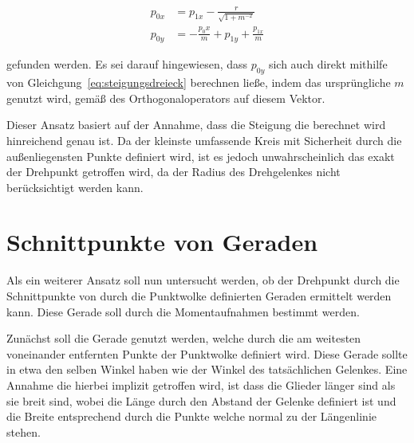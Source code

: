 \begin{equation}
    \begin{split}
        p_{0x} &= p_{1x} - \frac{r}{\sqrt{1 + m^{-2}}} \\
        p_{0y} &= - \frac{p_0x}{m} + p_{1y} + \frac{p_{1x}}{m}
    \end{split}
\end{equation}

gefunden werden.
Es sei darauf hingewiesen, dass $p_{0y}$ sich auch direkt mithilfe von Gleichgung~\ref{eq:steigungsdreieck} berechnen ließe, indem das ursprüngliche $m$ genutzt wird, gemäß des Orthogonaloperators auf diesem Vektor.

Dieser Ansatz basiert auf der Annahme, dass die Steigung die berechnet wird hinreichend genau ist.
Da der kleinste umfassende Kreis mit Sicherheit durch die außenliegensten Punkte definiert wird, ist es jedoch unwahrscheinlich das exakt der Drehpunkt getroffen wird, da der Radius des Drehgelenkes nicht berücksichtigt werden kann.



\section{Schnittpunkte von Geraden}\label{ch:schnittpunkt_gerade}

Als ein weiterer Ansatz soll nun untersucht werden, ob der Drehpunkt durch die Schnittpunkte von durch die Punktwolke definierten Geraden ermittelt werden kann.
Diese Gerade soll durch die Momentaufnahmen bestimmt werden.

Zunächst soll die Gerade genutzt werden, welche durch die am weitesten voneinander entfernten Punkte der Punktwolke definiert wird.
Diese Gerade sollte in etwa den selben Winkel haben wie der Winkel des tatsächlichen Gelenkes.
Eine Annahme die hierbei implizit getroffen wird, ist dass die Glieder länger sind als sie breit sind, wobei die Länge durch den Abstand der Gelenke definiert ist und die Breite entsprechend durch die Punkte welche normal zu der Längenlinie stehen.

